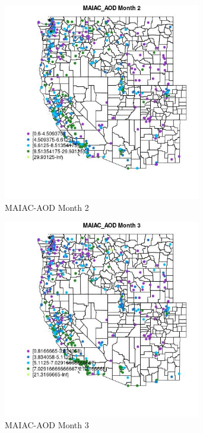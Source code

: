 \clearpage 

\begin{figure} 
\centering  
\includegraphics[width=0.77\textwidth]{Code_Outputs/ML_input_report_ML_input_PM25_Step5_part_d_de_duplicated_aves_ML_input_MapObsMo2MAIAC_AOD.jpg} 
\caption{\label{fig:ML_input_report_ML_input_PM25_Step5_part_d_de_duplicated_aves_ML_inputMapObsMo2MAIAC_AOD}MAIAC-AOD Month 2} 
\end{figure} 
 

\begin{figure} 
\centering  
\includegraphics[width=0.77\textwidth]{Code_Outputs/ML_input_report_ML_input_PM25_Step5_part_d_de_duplicated_aves_ML_input_MapObsMo3MAIAC_AOD.jpg} 
\caption{\label{fig:ML_input_report_ML_input_PM25_Step5_part_d_de_duplicated_aves_ML_inputMapObsMo3MAIAC_AOD}MAIAC-AOD Month 3} 
\end{figure} 
 

